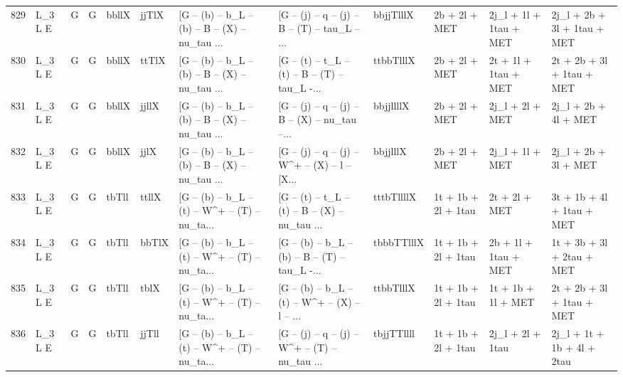 \begin{tabular}{llllllllllll}
829  &      L\_3 L E &     G &     G &       bbllX &       jjTlX &  [G -- (b) -- b\_L -- (b) -- B -- (X) -- nu\_tau ... &  [G -- (j) -- q -- (j) -- B -- (T) -- tau\_L -- ... &   bbjjTlllX &            2b + 2l + MET &   2j\_l + 1l + 1tau + MET &        2j\_l + 2b + 3l + 1tau + MET \\
830  &      L\_3 L E &     G &     G &       bbllX &       ttTlX &  [G -- (b) -- b\_L -- (b) -- B -- (X) -- nu\_tau ... &  [G -- (t) -- t\_L -- (t) -- B -- (T) -- tau\_L -... &   ttbbTlllX &            2b + 2l + MET &     2t + 1l + 1tau + MET &          2t + 2b + 3l + 1tau + MET \\
831  &      L\_3 L E &     G &     G &       bbllX &       jjllX &  [G -- (b) -- b\_L -- (b) -- B -- (X) -- nu\_tau ... &  [G -- (j) -- q -- (j) -- B -- (X) -- nu\_tau --... &   bbjjllllX &            2b + 2l + MET &          2j\_l + 2l + MET &               2j\_l + 2b + 4l + MET \\
832  &      L\_3 L E &     G &     G &       bbllX &        jjlX &  [G -- (b) -- b\_L -- (b) -- B -- (X) -- nu\_tau ... &  [G -- (j) -- q -- (j) -- W\textasciicircum + -- (X) -- l -- [X... &    bbjjlllX &            2b + 2l + MET &          2j\_l + 1l + MET &               2j\_l + 2b + 3l + MET \\
833  &      L\_3 L E &     G &     G &       tbTll &       ttllX &  [G -- (b) -- b\_L -- (t) -- W\textasciicircum + -- (T) -- nu\_ta... &  [G -- (t) -- t\_L -- (t) -- B -- (X) -- nu\_tau ... &  tttbTllllX &      1t + 1b + 2l + 1tau &            2t + 2l + MET &          3t + 1b + 4l + 1tau + MET \\
834  &      L\_3 L E &     G &     G &       tbTll &       bbTlX &  [G -- (b) -- b\_L -- (t) -- W\textasciicircum + -- (T) -- nu\_ta... &  [G -- (b) -- b\_L -- (b) -- B -- (T) -- tau\_L -... &  tbbbTTlllX &      1t + 1b + 2l + 1tau &     2b + 1l + 1tau + MET &          1t + 3b + 3l + 2tau + MET \\
835  &      L\_3 L E &     G &     G &       tbTll &        tblX &  [G -- (b) -- b\_L -- (t) -- W\textasciicircum + -- (T) -- nu\_ta... &  [G -- (b) -- b\_L -- (t) -- W\textasciicircum + -- (X) -- l -- ... &   ttbbTlllX &      1t + 1b + 2l + 1tau &       1t + 1b + 1l + MET &          2t + 2b + 3l + 1tau + MET \\
836  &      L\_3 L E &     G &     G &       tbTll &       jjTll &  [G -- (b) -- b\_L -- (t) -- W\textasciicircum + -- (T) -- nu\_ta... &  [G -- (j) -- q -- (j) -- W\textasciicircum + -- (T) -- nu\_tau ... &  tbjjTTllll &      1t + 1b + 2l + 1tau &         2j\_l + 2l + 1tau &         2j\_l + 1t + 1b + 4l + 2tau \\

\end{tabular}
